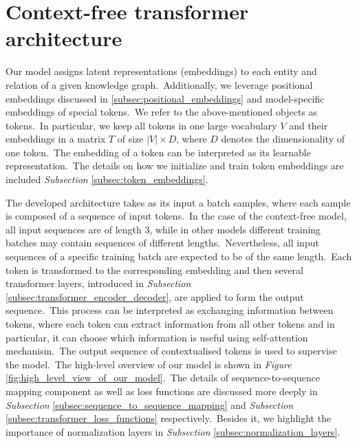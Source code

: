 \documentclass[longabstract, english, mgr]{iithesis}
\theoremstyle{default_theorem_style}\newtheorem{theorem}{Theorem}
\theoremstyle{default_theorem_style}\newtheorem{definition}{Definition}
\begin{document}
\section{Context-free transformer architecture}\label{sec:context_free_model}

Our model assigns latent representations (embeddings) to each entity and relation of a given knowledge
graph.\ Additionally, we leverage positional embeddings discussed in \ref{subsec:positional_embeddings} and
model-specific embeddings of special tokens.\ We refer to the above-mentioned objects as tokens.\ In particular, we
keep all tokens in one large vocabulary $V$ and their embeddings in a matrix $T$ of size $|V| \times D$, where $D$
denotes the dimensionality of one token.\ The embedding of a token can be interpreted as its learnable
representation.\ The details on how we initialize and train token embeddings are
included \textit{Subsection} \ref{subsec:token_embeddings}.\newline

\noindent The developed architecture takes as its input a batch samples, where each sample is composed of a sequence of
input tokens.\ In the case of the context-free model, all input sequences are of length 3, while in other models
different training batches may contain sequences of different lengths.\ Nevertheless, all input sequences of a specific
training batch are expected to be of the same length.\ Each token is transformed to the corresponding embedding and then
several transformer layers, introduced in \textit{Subsection} \ref{subsec:transformer_encoder_decoder}, are applied to
form the output sequence.\ This process can be interpreted as exchanging information between tokens, where each token
can extract information from all other tokens and in particular, it can choose which information is useful using
self-attention mechanism.\ The output sequence of contextualised tokens is used to supervise the model.\ The high-level
overview of our model is shown in \textit{Figure} \ref{fig:high_level_view_of_our_model}.\ The details of
sequence-to-sequence mapping component as well as loss functions are discussed more deeply in \textit{Subsection}
\ref{subsec:sequence_to_sequence_mapping} and \textit{Subsection} \ref{subsec:transformer_loss_functions}
respectively.\ Besides it, we highlight the importance of normalization layers in \textit{Subsection}
\ref{subsec:normalization_layers}.\newline
\end{document}
